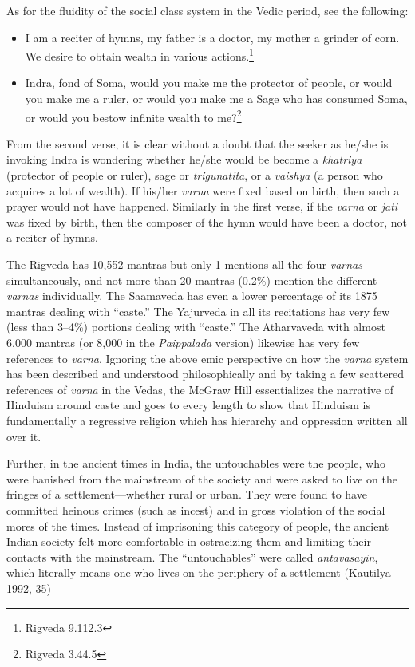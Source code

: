 As for the fluidity of the social class system in the Vedic period, see the following:

\begin{itemize} 
\item I am a reciter of hymns, my father is a doctor, my mother a grinder of corn. We desire to obtain wealth in various actions.\footnote{Rigveda 9.112.3}
\item Indra, fond of Soma, would you make me the protector of people, or would you make me a ruler, or would you make me a Sage who has consumed Soma, or would you bestow infinite wealth to me?\footnote{Rigveda 3.44.5} 
\end{itemize}

From the second verse, it is clear without a doubt that the seeker as he/she is invoking Indra is wondering whether he/she would be become a \textit{khatriya} (protector of people or ruler), sage or \textit{trigunatita},  or a \textit{vaishya} (a person who acquires a lot of wealth). If his/her \textit{varna} were fixed based on birth, then such a prayer would not have happened. Similarly in the first verse, if the \textit{varna} or \textit{jati} was fixed by birth, then the composer of the hymn would have been a doctor, not a reciter of hymns. 

The Rigveda has 10,552 mantras but only 1 mentions all the four \textit{varnas} simultaneously, and not more than 20 mantras (0.2\%) mention the different \textit{varnas} individually. The Saamaveda has even a lower percentage of its 1875 mantras dealing with “caste.” The Yajurveda in all its recitations has very few (less than 3--4\%) portions dealing with “caste.” The Atharvaveda with almost 6,000 mantras (or 8,000 in the \textit{Paippalada} version) likewise has very few references to \textit{varna}. Ignoring the above emic perspective on how the \textit{varna} system has been described and understood philosophically and by taking a few scattered references of \textit{varna} in the Vedas, the McGraw Hill essentializes the narrative of Hinduism around caste and goes to every length to show that Hinduism is fundamentally a regressive religion which has hierarchy and oppression written all over it. 

Further, in the ancient times in India, the untouchables were the people, who were banished from the mainstream of the society and were asked to live on the fringes of a settlement—whether rural or urban. They were found to have committed heinous crimes (such as incest) and in gross violation of the social mores of the times. Instead of imprisoning this category of people, the ancient Indian society felt more comfortable in ostracizing them and limiting their contacts with the mainstream. The “untouchables” were called \textit{antavasayin},  which literally means one who lives on the periphery of a settlement (Kautilya 1992, 35)

